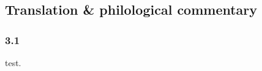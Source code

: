


\pagestyle{HPed}
\begin{ekdosis}

\chapter*{Translation \& philological commentary}
\subsection*{3.1}
\begin{translation}[hp03_001]
test.
\end{translation}

\end{ekdosis}

